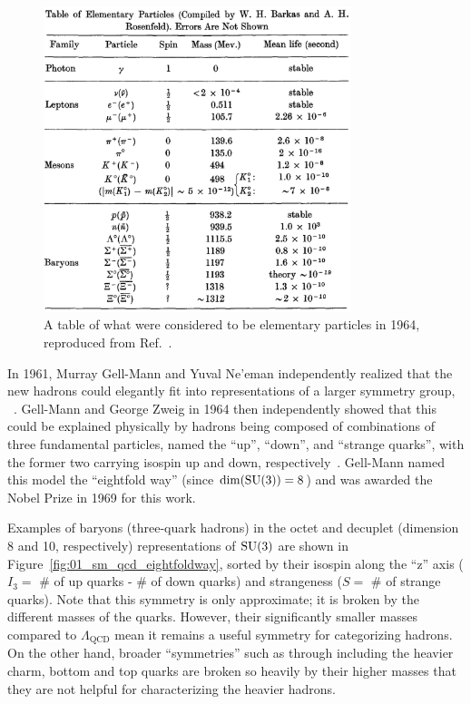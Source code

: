 \begin{figure}[ht]
	\centering
	\includegraphics[width=0.8\textwidth]{figures/01-SM-03-SM/qcd/table_elementary_particles_sakurai.png}
	\caption{A table of what were considered to be elementary particles in 1964, reproduced from Ref.~\cite{Sakurai:2015gmk}.}
	\label{fig:01_sm_qcd_particle_zoo}
\end{figure}

In 1961, Murray Gell-Mann and Yuval Ne'eman independently realized that the new hadrons could elegantly fit into representations of a larger symmetry group, \SU[3]~\cite{Gell-Mann:1961omu, Neeman:1961jhl}.
Gell-Mann and George Zweig in 1964 then independently showed that this could be explained physically by hadrons being composed of combinations of three fundamental particles, named the ``up'', ``down'', and ``strange quarks'', with the former two carrying isospin up and down, respectively~\cite{Gell-Mann:1964ewy, Zweig:1964jf}.
Gell-Mann named this model the ``eightfold way'' (since $\dim (\SU[3]) = 8$) and was awarded the Nobel Prize in 1969 for this work.

Examples of baryons (three-quark hadrons) in the octet and decuplet (dimension 8 and 10, respectively) representations of $\SU[3]$ are shown in Figure~\ref{fig:01_sm_qcd_eightfoldway}, sorted by their isospin along the ``z'' axis ($I_3 = $ \# of up quarks - \# of down quarks) and strangeness ($S = $ \# of strange quarks).
Note that this \SU[3] symmetry is only approximate; it is broken by the different masses of the quarks.
However, their significantly smaller masses compared to $\Lambda_\mathrm{QCD}$ mean it remains a useful symmetry for categorizing hadrons.
On the other hand, broader ``symmetries'' such as \SU[4] through \SU[6] including the heavier charm, bottom and top quarks are broken so heavily by their higher masses that they are not helpful for characterizing the heavier hadrons.

